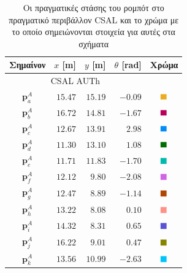 \begin{table}\centering
  \begin{tabular} {c|rrrc}                                                 \toprule
    Σημαίνον       & $x$ [m]   & $y$  [m]  & $\theta$ [rad]  & Χρώμα    \\ \toprule
    \multicolumn{4}{c}{CSAL AUTh}                                       \\ \midrule
    $\bm{p}_a^A$   & $15.47$   & $15.19$   & $-0.09$         & $\squarea$ \\
    $\bm{p}_b^A$   & $16.72$   & $14.81$   & $-1.67$         & $\squareb$ \\
    $\bm{p}_c^A$   & $12.67$   & $13.91$   & $2.98$          & $\squarec$ \\
    $\bm{p}_d^A$   & $11.30$   & $13.10$   & $1.08$          & $\squared$ \\
    $\bm{p}_e^A$   & $11.71$   & $11.83$   & $-1.70$         & $\squaree$ \\
    $\bm{p}_f^A$   & $12.12$   & $9.80$    & $-2.08$         & $\squaref$ \\
    $\bm{p}_g^A$   & $12.47$   & $8.89$    & $-1.14$         & $\squareg$ \\
    $\bm{p}_h^A$   & $13.22$   & $8.08$    & $0.10$          & $\squareh$ \\
    $\bm{p}_i^A$   & $14.32$   & $8.31$    & $0.65$          & $\squarei$ \\
    $\bm{p}_j^A$   & $16.22$   & $9.01$    & $0.47$          & $\squarej$ \\
    $\bm{p}_k^A$   & $13.56$   & $10.99$   & $-2.63$         & $\squarek$ \\ \bottomrule
  \end{tabular}
  \caption{\small Οι πραγματικές στάσης του ρομπότ στο πραγματικό περιβάλλον
           CSAL και το χρώμα με το οποίο σημειώνονται στοιχεία για αυτές στα
           σχήματα}
  \label{tbl:02_03_04:true_poses_experiment}
\end{table}


